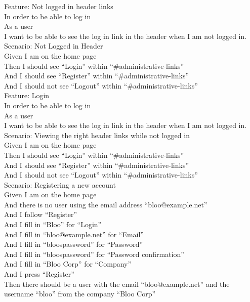 \documentclass[12pt]{article}
\begin{document}
\begin{hangparas}{0.25in}{1}
Feature: Not logged in header links \\
In order to be able to log in \\
As a user \\
I want to be able to see the log in link in the header when I am not logged in. \\

Scenario: Not Logged in Header  \\
Given I am on the home page \\
Then I should see ``Login'' within ``\#administrative-links'' \\
And I should see ``Register'' within ``\#administrative-links'' \\
And I should not see ``Logout'' within ``\#administrative-links'' \\

Feature: Login \\
  In order to be able to log in \\
  As a user \\
  I want to be able to see the log in link in the header when I am not logged in. \\

Scenario: Viewing the right header links while not logged in  \\
  Given I am on the home page \\
  Then I should see ``Login'' within ``\#administrative-links'' \\
  And I should see ``Register'' within ``\#administrative-links'' \\
  And I should not see ``Logout'' within ``\#administrative-links'' \\


Scenario: Registering a new account \\
Given I am on the home page \\
And there is no user using the email address ``bloo@example.net'' \\
And I follow ``Register'' \\
And I fill in ``Bloo'' for ``Login'' \\
And I fill in ``bloo@example.net'' for ``Email'' \\
And I fill in ``bloospassword'' for ``Password'' \\
And I fill in ``bloospassword'' for ``Password confirmation'' \\
And I fill in ``Bloo Corp'' for ``Company'' \\
And I press ``Register'' \\
Then there should be a user with the email ``bloo@example.net'' and the username ``bloo'' from the company ``Bloo Corp'' \\


\end{hangparas}
\end{document}
